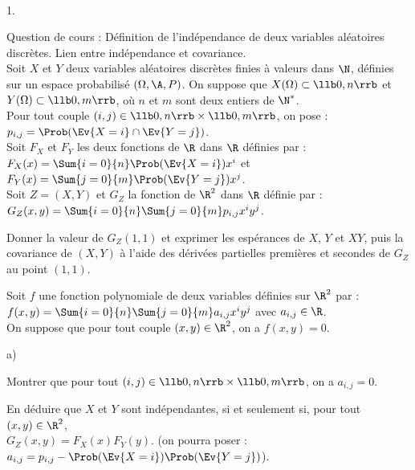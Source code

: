 \begin{exerciceAP}~
  \begin{noliste}{1.}
    \setlength{\itemsep}{2mm}
  \item Question de cours : Définition de l'indépendance de deux
    variables aléatoires discrètes. Lien entre indépendance et
    covariance.\\
    Soit $X$ et $Y$ deux variables aléatoires discrètes finies à
    valeurs dans $\N$, définies sur un espace probabilisé
    $(\Omega,\A,P)$. On suppose que $X(\Omega)\subset \llb0,n\rrb$ et
    $Y(\Omega) \subset \llb 0, m \rrb$, où $n$ et $m$ sont deux
    entiers de $\N^*$.\\
    Pour tout couple $(i,j) \in \llb 0, n \rrb \times \llb 0, m \rrb$,
    on pose : $p_{i,j} = \Prob(\Ev{X=i} \cap \Ev{Y=j})$.\\
    Soit $F_X$ et $F_Y$ les deux fonctions de $\R$ dans $\R$ définies
    par : $F_X(x)=\Sum{i=0}{n} \Prob(\Ev{X=i})x^i$ et \\
    $F_Y(x)=\Sum{j=0}{m} \Prob(\Ev{Y=j})x^j$.\\
    Soit $Z=(X,Y)$ et $G_Z$ la fonction de $\R^2$ dans $\R$ définie
    par : $G_Z(x,y)=\Sum{i=0}{n}\Sum{j=0}{m} p_{i,j}x^iy^j$.

  \item Donner la valeur de $G_Z(1,1)$ et exprimer les espérances de
    $X$, $Y$ et $XY$, puis la covariance de $(X,Y)$ à l'aide des
    dérivées partielles premières et secondes de $G_Z$ au point
    $(1,1)$.

  \item Soit $f$ une fonction polynomiale de deux variables définies
    sur $\R^2$ par : $f(x,y) = \Sum{i=0}{n} \Sum{j=0}{m}
    a_{i,j}x^iy^j$ avec $a_{i,j} \in \R$.\\
    On suppose que pour tout couple $(x,y)\in\R^2$, on a $f(x,y)=0$.
    \begin{noliste}{a)}
    \setlength{\itemsep}{2mm}
  \item Montrer que pour tout $(i,j) \in \llb0, n \rrb \times \llb 0,
    m \rrb$, on a $a_{i,j}=0$.
    \item En déduire que $X$ et $Y$ sont indépendantes, si et
      seulement si, pour tout $(x,y)\in\R^2$,\\
      $G_Z(x,y)=F_X(x)F_Y(y)$. (on pourra poser : $a_{i,j}=p_{i,j} -
      \Prob(\Ev{X=i})\Prob(\Ev{Y=j})$).
    \end{noliste}


\end{noliste}
\end{exerciceAP}
